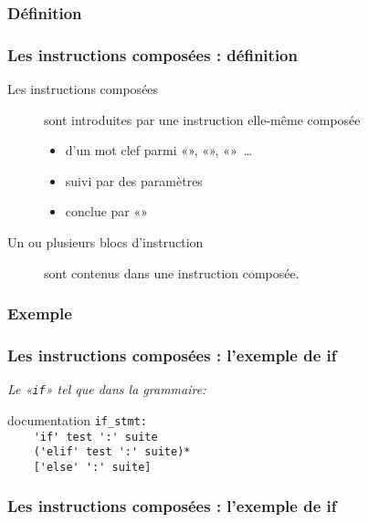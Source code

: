 \subsubsection{Définition}
\begin{frame}[fragile]
  \frametitle{Les instructions composées : définition}
  \begin{description}
  \item[Les instructions composées] sont introduites par une instruction elle-même composée \pause
  \begin{itemize}
      \item d'un mot clef parmi «», «», «»~\ldots \pause
      \item suivi par des paramètres \pause
      \item conclue par «\hlcmd{:}» \pause
  \end{itemize}
  \item[Un ou plusieurs blocs d'instruction] sont contenus dans une instruction composée.
  \end{description}
\end{frame}

\subsubsection{Exemple}
\begin{frame}[fragile]
  \frametitle{Les instructions composées : l'exemple de if}
  \emph{Le «\texttt{if}» tel que dans la grammaire:}\\
  \begin{beamercolorbox}{documentation}
  \small{\verb|if_stmt:|} \\
  \small{\verb|    'if' test ':' suite|} \\
  \small{\verb|    ('elif' test ':' suite)*|} \\
  \small{\verb|    ['else' ':' suite]|}
  \end{beamercolorbox}
\end{frame}

\begin{frame}[fragile]
  \frametitle{Les instructions composées : l'exemple de if}
  \begin{ipython}
  \end{ipython}
\end{frame}

